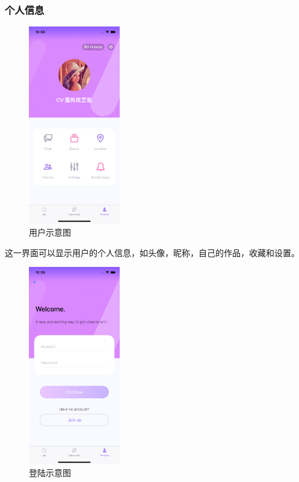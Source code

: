 \subsubsection{个人信息}


\begin{figure}
\includegraphics[width=4cm]{figures/用户.png}
\caption{用户示意图}
\label{fig:my_label}
\end{figure}


这一界面可以显示用户的个人信息，如头像，昵称，自己的作品，收藏和设置。



\begin{figure}
\includegraphics[width=4cm]{figures/登录.png}
\caption{登陆示意图}
\label{fig:my_label}
\end{figure}

